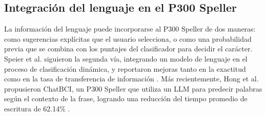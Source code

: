 \subsection{Integración del lenguaje en el P300 Speller}

La información del lenguaje puede incorporarse al P300 Speller de dos maneras: como sugerencias
explícitas que el usuario selecciona, o como una probabilidad previa que se combina con los
puntajes del clasificador para decidir el carácter. Speier et al. siguieron la segunda vía,
integrando un modelo de lenguaje en el proceso de clasificación dinámica, y reportaron mejoras
tanto en la exactitud como en la tasa de transferencia de información \cite{speier2012}. Más
recientemente, Hong et al. propusieron ChatBCI, un P300 Speller que utiliza un LLM para predecir
palabras según el contexto de la frase, logrando una reducción del tiempo promedio de escritura de
62.14\% \cite{hong2026}.

